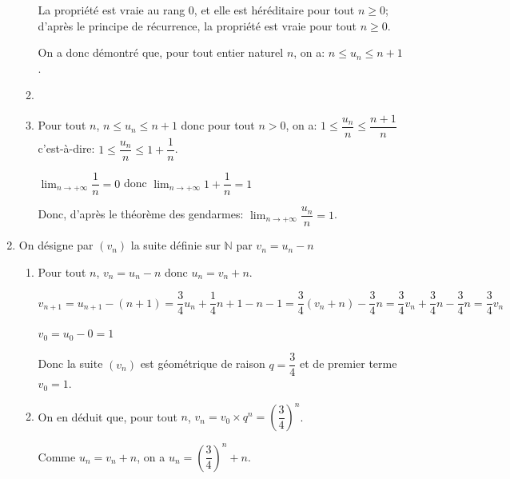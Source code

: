 \documentclass[10pt]{article}
\providecommand{\N}{\mathbb{N}}
\providecommand{\ds}{\displaystyle}
\begin{document}
\begin{enumerate}[resume]
\begin{enumerate}
\begin{list}{\textbullet}{}
La propriété est vraie au rang 0, et elle est héréditaire pour tout $n\geqslant 0$; d'après le principe de récurrence, la propriété est vraie pour tout $n\geqslant 0$.
\end{list}		

On a donc démontré que, pour tout entier naturel $n$, on a: $n \leqslant u_n \leqslant n + 1$.
		
		\item
{}		
		
		
		\item
Pour tout $n$, $n\leqslant u_n \leqslant n+1$ donc pour tout $n>0$, on a:
$1 \leqslant \dfrac{u_n}{n} \leqslant \dfrac{n+1}{n}$ c'est-à-dire: 
$1 \leqslant \dfrac{u_n}{n} \leqslant 1+\dfrac{1}{n}$.

$\ds\lim_{n \to +\infty} \dfrac{1}{n}=0$ donc $\ds\lim_{n \to +\infty} 1+\dfrac{1}{n}=1$

Donc, d'après le théorème des gendarmes: $\ds\lim_{n\to +\infty} \dfrac{u_n}{n}=1$.

	\end{enumerate}
\item  On désigne par $\left(v_n\right)$ la suite définie sur $\N$ par $v_n = u_n - n$
	\begin{enumerate}
		\item
Pour tout $n$, $v_n=u_n-n$ donc $u_n=v_n+n$.

$v_{n+1}=u_{n+1} - (n+1) = 	\dfrac{3}{4}u_n + \dfrac{1}{4}n+1 -n-1
=\dfrac{3}{4}\left (v_n+n\right ) -\dfrac{3}{4}n
=\dfrac{3}{4}v_n +\dfrac{3}{4}n -\dfrac{3}{4}n
=\dfrac{3}{4}v_n$

$v_0=u_0-0=1$

Donc la suite $(v_n)$ est géométrique de raison $q=\dfrac{3}{4}$ et de premier terme $v_0=1$.
		
		
		\item 
On en déduit que, pour tout $n$, $v_n=v_0\times q^n = \left (\dfrac{3}{4}\right )^n$.

Comme $u_n=v_n+n$, on a $u_n=\left (\dfrac{3}{4}\right )^n + n$.		
		
	\end{enumerate}
\end{enumerate}

\bigskip
\end{document}
